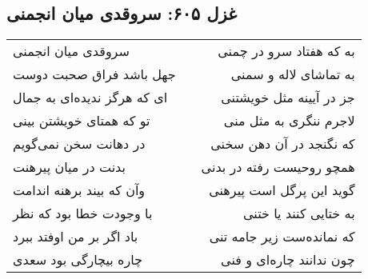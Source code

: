 \begin{center}
\section*{غزل ۶۰۵: سروقدی میان انجمنی}
\label{sec:605}
\begin{longtable}{l p{0.5cm} r}
سروقدی میان انجمنی
&&
به که هفتاد سرو در چمنی
\\
جهل باشد فراق صحبت دوست
&&
به تماشای لاله و سمنی
\\
ای که هرگز ندیده‌ای به جمال
&&
جز در آیینه مثل خویشتنی
\\
تو که همتای خویشتن بینی
&&
لاجرم ننگری به مثل منی
\\
در دهانت سخن نمی‌گویم
&&
که نگنجد در آن دهن سخنی
\\
بدنت در میان پیرهنت
&&
همچو روحیست رفته در بدنی
\\
وآن که بیند برهنه اندامت
&&
گوید این پرگل است پیرهنی
\\
با وجودت خطا بود که نظر
&&
به ختایی کنند یا ختنی
\\
باد اگر بر من اوفتد ببرد
&&
که نمانده‌ست زیر جامه تنی
\\
چاره بیچارگی بود سعدی
&&
چون ندانند چاره‌ای و فنی
\\
\end{longtable}
\end{center}
